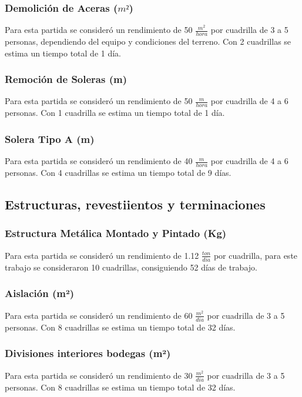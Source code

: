 \documentclass{article} %
\begin{document}
\subsubsection{Demolición de Aceras ($m²$)}

Para esta partida se consideró un rendimiento de 50 $\frac{m^2}{hora}$ por cuadrilla de 3 a 5 personas, dependiendo del equipo y condiciones del terreno. Con 2 cuadrillas se estima un tiempo total de 1 día.

\subsubsection{Remoción de Soleras (m)}

Para esta partida se consideró un rendimiento de 50 $\frac{m}{hora}$ por cuadrilla de 4 a 6 personas. Con 1 cuadrilla se estima un tiempo total de 1 día.

\subsubsection{Solera Tipo A (m)}

Para esta partida se consideró un rendimiento de 40 $\frac{m}{hora}$ por cuadrilla de 4 a 6 personas. Con 4 cuadrillas se estima un tiempo total de 9 días.

\subsection{Estructuras, revestiientos y terminaciones}

\subsubsection{Estructura Metálica Montado y Pintado (Kg)}
Para esta partida se consideró un rendimiento de 1.12 $\frac{ton}{dia}$ por cuadrilla, para este trabajo se consideraron 10 cuadrillas, consiguiendo 52 días de trabajo.

\subsubsection{Aislación (m²)}
Para esta partida se consideró un rendimiento de 60 $\frac{m^2}{dia}$ por cuadrilla de 3 a 5 personas. Con 8 cuadrillas se estima un tiempo total de 32 días.

\subsubsection{Divisiones interiores bodegas (m²)}
Para esta partida se consideró un rendimiento de 30 $\frac{m^2}{dia}$ por cuadrilla de 3 a 5 personas. Con 8 cuadrillas se estima un tiempo total de 32 días.
\end{document}
